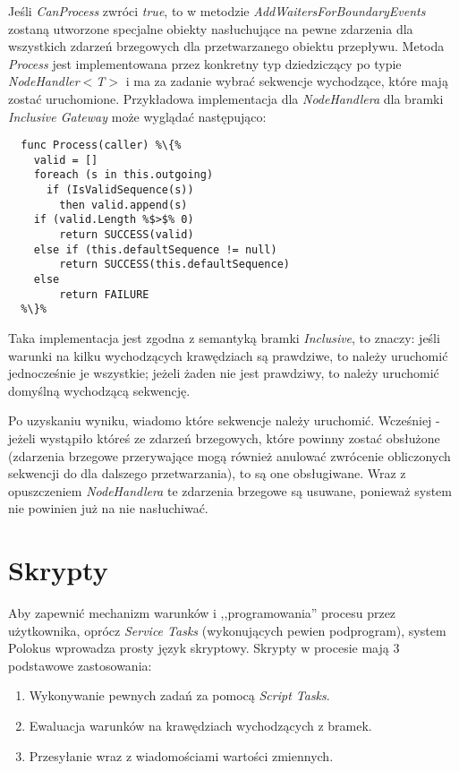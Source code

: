 \documentclass[declaration,shortabstract,mgr]{iithesis}
\newcommand{\typicalVerticalSpace}{\setlength\itemsep{0em}}
\begin{document}
Jeśli \textit{CanProcess} zwróci \textit{true}, to w metodzie \textit{AddWaitersForBoundaryEvents} zostaną utworzone specjalne obiekty nasłuchujące na pewne zdarzenia dla wszystkich zdarzeń brzegowych dla przetwarzanego obiektu przepływu. Metoda \textit{Process} jest implementowana przez konkretny typ dziedziczący po typie \textit{NodeHandler$<$T$>$} i ma za zadanie wybrać sekwencje wychodzące, które mają zostać uruchomione. Przykładowa implementacja dla \textit{NodeHandlera} dla bramki \textit{Inclusive Gateway} może wyglądać następująco:

\begin{minipage}[c]{\textwidth}
\centering
\begin{lstlisting}
  func Process(caller) %\{%
    valid = []
    foreach (s in this.outgoing)
      if (IsValidSequence(s))
        then valid.append(s)
    if (valid.Length %$>$% 0)
        return SUCCESS(valid)
    else if (this.defaultSequence != null)
        return SUCCESS(this.defaultSequence)
    else
        return FAILURE  
  %\}%
\end{lstlisting}
\end{minipage}

Taka implementacja jest zgodna z semantyką bramki \textit{Inclusive}, to znaczy: jeśli warunki na kilku wychodzących krawędziach są prawdziwe, to należy uruchomić jednocześnie je wszystkie; jeżeli żaden nie jest prawdziwy, to należy uruchomić domyślną wychodzącą sekwencję.

Po uzyskaniu wyniku, wiadomo które sekwencje należy uruchomić. 
Wcześniej - jeżeli wystąpiło któreś ze zdarzeń brzegowych, które powinny zostać obsłużone (zdarzenia brzegowe przerywające mogą również anulować zwrócenie obliczonych sekwencji do dla dalszego przetwarzania), to są 
one obsługiwane. Wraz z opuszczeniem \textit{NodeHandlera} te zdarzenia brzegowe są usuwane, ponieważ system nie powinien już na nie nasłuchiwać.

\section{Skrypty}
Aby zapewnić mechanizm warunków i ,,programowania'' procesu przez użytkownika, oprócz \textit{Service Tasks} (wykonujących pewien podprogram), system Polokus wprowadza prosty język skryptowy. Skrypty w procesie mają 3 podstawowe zastosowania:
\begin{enumerate}
    \typicalVerticalSpace
    \item Wykonywanie pewnych zadań za pomocą \textit{Script Tasks}.
    \item Ewaluacja warunków na krawędziach wychodzących z bramek.
    \item Przesyłanie wraz z wiadomościami wartości zmiennych.
\end{enumerate}
\end{document}
